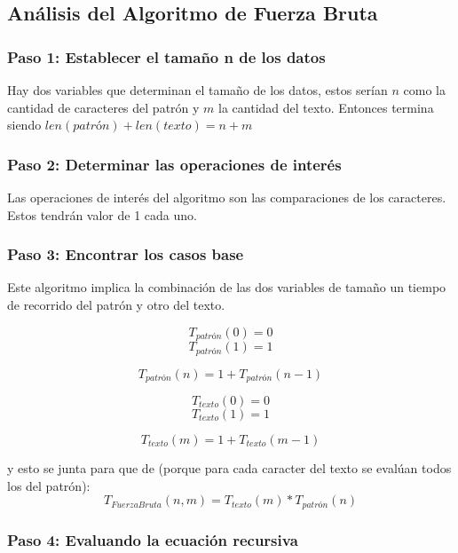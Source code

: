 \subsection*{Análisis del Algoritmo de Fuerza Bruta}

\subsubsection*{Paso 1: Establecer el tamaño n de los datos}
Hay dos variables que determinan el tamaño de los datos, estos serían $n$ como la cantidad de caracteres del patrón y $m$ la cantidad del texto. Entonces termina siendo $len(patrón) + len(texto) = n + m$

\subsubsection*{Paso 2: Determinar las operaciones de interés}
Las operaciones de interés del algoritmo son las comparaciones de los caracteres. Estos tendrán valor de 1 cada uno.

\subsubsection*{Paso 3: Encontrar los casos base}
Este algoritmo implica la combinación de las dos variables de tamaño un tiempo de recorrido del patrón y otro del texto.

\[T_{patrón}(0) =  0\]
\[T_{patrón}(1) = 1\]

\[T_{patrón}(n) = 1 + T_{patrón}(n-1)\]

\[T_{texto}(0) =  0\]
\[T_{texto}(1) = 1\]

\[T_{texto}(m) = 1 + T_{texto}(m-1)\]

y esto se junta para que de (porque para cada caracter del texto se evalúan todos los del patrón):
\[T_{Fuerza Bruta}(n,m) = T_{texto}(m) * T_{patrón}(n)\]

\subsubsection*{Paso 4: Evaluando la ecuación recursiva}


